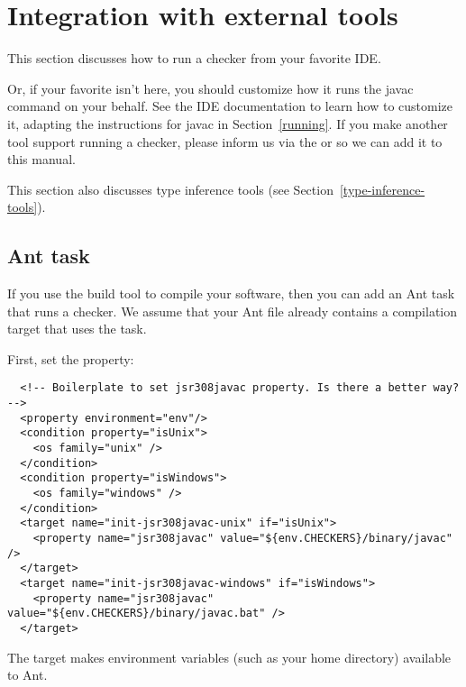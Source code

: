 \htmlhr
\chapter{Integration with external tools\label{external-tools}}

This section discusses how to run a checker from your favorite IDE\@.

Or, if your favorite isn't here, you should customize how it runs the
javac command on your behalf.  See the IDE documentation to learn how to
customize it, adapting the instructions for javac in Section~\ref{running}.
If you make another tool support running a checker, please 
inform us via the
 or
 so
we can add it to this manual.

This section also discusses type inference tools (see
Section~\ref{type-inference-tools}).


\section{Ant task\label{ant-task}}

If you use the  build tool to compile
your software, then you can add an Ant task that runs a checker.  We assume
that your Ant file already contains a compilation target that uses the
 task.

First, set the  property:

\begin{smaller}
\begin{Verbatim}
  <!-- Boilerplate to set jsr308javac property. Is there a better way? -->
  <property environment="env"/>
  <condition property="isUnix">
    <os family="unix" />
  </condition>
  <condition property="isWindows">
    <os family="windows" />
  </condition>
  <target name="init-jsr308javac-unix" if="isUnix">
    <property name="jsr308javac" value="${env.CHECKERS}/binary/javac" />
  </target>
  <target name="init-jsr308javac-windows" if="isWindows">
    <property name="jsr308javac" value="${env.CHECKERS}/binary/javac.bat" />
  </target>
\end{Verbatim}
\end{smaller}

\noindent
The  target makes environment variables (such as your home
directory) available to Ant.

